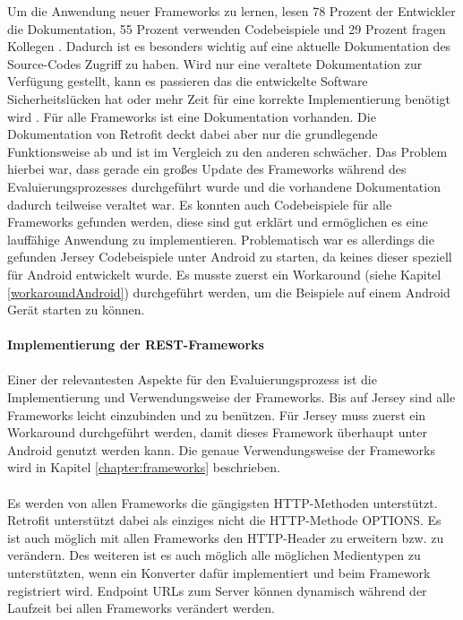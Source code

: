 Um die Anwendung neuer Frameworks zu lernen, lesen 78 Prozent der Entwickler die Dokumentation, 55 Prozent verwenden Codebeispiele und 29 Prozent fragen Kollegen \cite{robillard:apis}. Dadurch ist es besonders wichtig auf eine aktuelle Dokumentation des Source-Codes Zugriff zu haben. Wird nur eine veraltete Dokumentation zur Verfügung gestellt, kann es passieren das die entwickelte Software Sicherheitslücken hat oder mehr Zeit für eine korrekte Implementierung benötigt wird \cite{lethbridge:documentation}. Für alle Frameworks ist eine Dokumentation vorhanden. Die Dokumentation von Retrofit deckt dabei aber nur die grundlegende Funktionsweise ab und ist im Vergleich zu den anderen schwächer. Das Problem hierbei war, dass gerade ein großes Update des Frameworks während des Evaluierungsprozesses durchgeführt wurde und die vorhandene Dokumentation dadurch teilweise veraltet war. Es konnten auch Codebeispiele für alle Frameworks gefunden werden, diese sind gut erklärt und ermöglichen es eine lauffähige Anwendung zu implementieren. Problematisch war es allerdings die gefunden Jersey Codebeispiele unter Android zu starten, da keines dieser speziell für Android entwickelt wurde. Es musste zuerst ein Workaround (siehe Kapitel \ref{workaroundAndroid}) durchgeführt werden, um die Beispiele auf einem Android Gerät starten zu können.
\\\\
{\large \textbf{Implementierung der REST-Frameworks}}\\\\
Einer der relevantesten Aspekte für den Evaluierungsprozess ist die Implementierung und Verwendungsweise der Frameworks. Bis auf Jersey sind alle Frameworks leicht einzubinden und zu benützen. Für Jersey muss zuerst ein Workaround durchgeführt werden, damit dieses Framework überhaupt unter Android genutzt werden kann. Die genaue Verwendungsweise der Frameworks wird in Kapitel \ref{chapter:frameworks} beschrieben.
\\\\
Es werden von allen Frameworks die gängigsten HTTP-Methoden unterstützt. Retrofit unterstützt dabei als einziges nicht die HTTP-Methode OPTIONS. Es ist auch möglich mit allen Frameworks den HTTP-Header zu erweitern bzw. zu verändern. Des weiteren ist es auch möglich alle möglichen Medientypen zu unterstützten, wenn ein Konverter dafür implementiert und beim Framework registriert wird. Endpoint URLs zum Server können dynamisch während der Laufzeit bei allen Frameworks verändert werden. 
\\\\
